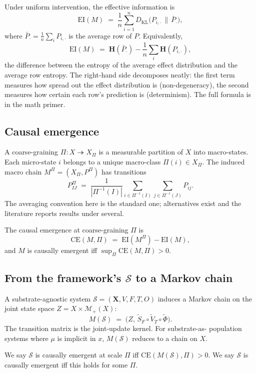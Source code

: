 Under uniform intervention, the effective information is
\[
  \mathrm{EI}(M) \;=\; \frac{1}{n} \sum_{i=1}^{n} D_{\mathrm{KL}}\!\big(
  P_{i,\cdot} \,\|\, \bar P_\cdot\big),
\]
where $\bar P_\cdot = \frac{1}{n} \sum_i P_{i,\cdot}$ is the average
row of $P$. Equivalently,
\[
  \mathrm{EI}(M) \;=\; \mathbf{H}(\bar P_\cdot) - \frac{1}{n} \sum_i
  \mathbf{H}(P_{i,\cdot}),
\]
the difference between the entropy of the average effect distribution
and the average row entropy. The right-hand side decomposes neatly:
the first term measures how spread out the effect distribution is
(non-degeneracy), the second measures how certain each row's
prediction is (determinism). The full formula is in the math primer.

\subsection*{Causal emergence}

A coarse-graining $\Pi : X \twoheadrightarrow X_\Pi$ is a measurable
partition of $X$ into macro-states. Each micro-state $i$ belongs to a
unique macro-class $\Pi(i) \in X_\Pi$. The induced macro chain
$M^\Pi = (X_\Pi, P^\Pi)$ has transitions
\[
  P^\Pi_{IJ} \;=\; \frac{1}{|\Pi^{-1}(I)|}
  \sum_{i \in \Pi^{-1}(I)} \sum_{j \in \Pi^{-1}(J)} P_{ij}.
\]
The averaging convention here is the standard one; alternatives exist
and the literature reports results under several.

The causal emergence at coarse-graining $\Pi$ is
\[
  \mathrm{CE}(M, \Pi) \;=\; \mathrm{EI}(M^\Pi) - \mathrm{EI}(M),
\]
and $M$ is causally emergent iff $\sup_\Pi \mathrm{CE}(M, \Pi) > 0$.

\subsection*{From the framework's $\mathcal{S}$ to a Markov chain}

A substrate-agnostic system $\mathcal{S} = (\mathbf{X}, V, F, T, O)$
induces a Markov chain on the joint state space $Z = X \times
\mathcal{M}_+(X)$:
\[
  M(\mathcal{S}) \;=\; \big(Z,\, \widetilde S_F \circ \widetilde V_T
  \circ \widetilde\Phi\big).
\]
The transition matrix is the joint-update kernel. For substrate-as-
population systems where $\mu$ is implicit in $x$, $M(\mathcal{S})$
reduces to a chain on $X$.

We say $\mathcal{S}$ is causally emergent at scale $\Pi$ iff $\mathrm{
CE}(M(\mathcal{S}), \Pi) > 0$. We say $\mathcal{S}$ is causally
emergent iff this holds for some $\Pi$.

